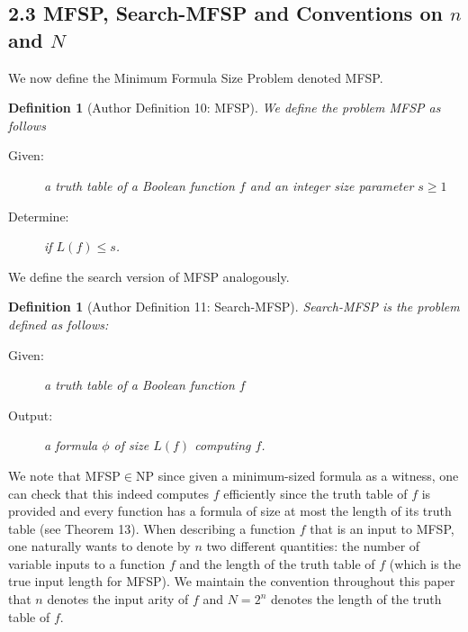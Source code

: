 \documentclass[10pt,a4paper]{article}
\newtheorem{ntdefinition}[nttheorem]{Definition}
\begin{document}
\subsection*{2.3 MFSP, Search-MFSP and Conventions on $n$ and $N$}
We now define the Minimum Formula Size Problem denoted MFSP.
\setcounter{nttheorem}{9}
\begin{ntdefinition}[Author Definition 10: MFSP]
We define the problem MFSP as follows
\begin{description}\item[Given:] a truth table of a Boolean function $f$ and an integer size parameter $s\geq 1$\item[Determine:] if $L(f)\leq s$.\end{description}
\end{ntdefinition}
We define the search version of MFSP analogously.
\begin{ntdefinition}[Author Definition 11: Search-MFSP]
Search-MFSP is the problem defined as follows:
\begin{description}\item[Given:] a truth table of a Boolean function $f$\item[Output:] a formula $\phi$ of size $L(f)$ computing $f$.\end{description}
\end{ntdefinition}
We note that MFSP$\in\mathrm{NP}$ since given a minimum-sized formula as a witness, one can check that this indeed computes $f$ efficiently since the truth table of $f$ is provided and every function has a formula of size at most the length of its truth table (see Theorem 13).
When describing a function $f$ that is an input to MFSP, one naturally wants to denote by $n$ two different quantities: the number of variable inputs to a function $f$ and the length of the truth table of $f$ (which is the true input length for MFSP). We maintain the convention throughout this paper that $n$ denotes the input arity of $f$ and $N=2^n$ denotes the length of the truth table of $f$.
\end{document}

